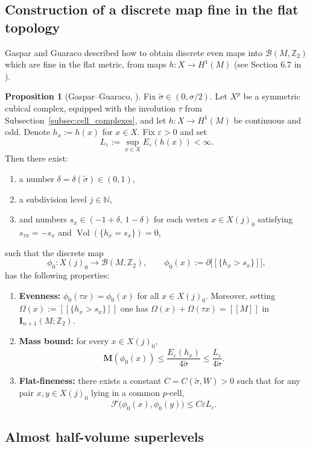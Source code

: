 \documentclass[12pt,english]{article}
\theoremstyle{definition}
\newtheorem{proposition}[theorem]{Proposition}
\begin{document}
\subsection{Construction of a discrete map fine in the flat topology}

Gaspar and Guaraco described how to obtain discrete even maps into $\mathcal B(M,\mathbb{Z}_2)$ which are fine in the flat metric, from maps $h:X\to H^1(M)$ (see Section 6.7 in \cite{GG2}).

\begin{proposition}[Gaspar--Guaraco, \cite{GG2}]
\label{prop:GG_flat_fine_discrete}
Fix $\tilde\sigma\in(0,\sigma/2)$. Let $X^p$ be a symmetric cubical complex, equipped with the involution $\tau$ from Subsection~\ref{subsec:cell_complexes}, and let $h:X\to H^1(M)$ be continuous and odd. Denote $h_x := h(x)$ for $x \in X$. Fix $\varepsilon>0$ and set
\[
L_\varepsilon := \sup_{x\in X} E_\varepsilon(h(x))<\infty.
\]
Then there exist:
\begin{enumerate}
\item a number $\delta=\delta(\tilde\sigma)\in(0,1)$,
\item a subdivision level $j\in\mathbb{N}$,
\item and numbers $s_x\in(-1+\delta,\,1-\delta)$ for each vertex $x\in X(j)_0$
      satisfying $s_{\tau x}=-s_x$ and $\operatorname{Vol}(\{h_x=s_x\})=0$,
\end{enumerate}
such that the discrete map
\[
\phi_0:X(j)_0\to \mathcal B(M,\mathbb{Z}_2),
\qquad
\phi_0(x):=\partial\big[\![\{h_x>s_x\}]\!\big],
\]
has the following properties:
\begin{enumerate}
\item[(i)] \textbf{Evenness:} $\phi_0(\tau x)=\phi_0(x)$ for all $x\in X(j)_0$.
Moreover, setting $\Omega(x):=[\![\{h_x>s_x\}]\!]$ one has
$\Omega(x)+\Omega(\tau x)=[\![M]\!]$ in $\mathbf I_{n+1}(M;\mathbb{Z}_2)$.
\item[(ii)] \textbf{Mass bound:} for every $x\in X(j)_0$,
\[
\mathbf M(\phi_0(x)) \le \frac{E_\varepsilon(h_x)}{4\tilde\sigma}\le \frac{L_\varepsilon}{4\tilde\sigma}.
\]
\item[(iii)] \textbf{Flat-fineness:} there exists a constant $C=C(\tilde\sigma,W)>0$
such that for any pair $x,y\in X(j)_0$ lying in a common $p$-cell,
\[
\mathcal F\big(\phi_0(x),\phi_0(y)\big) \le C\varepsilon L_\varepsilon.
\]
\end{enumerate}
\end{proposition}

\subsection{Almost half-volume superlevels}
\end{document}
